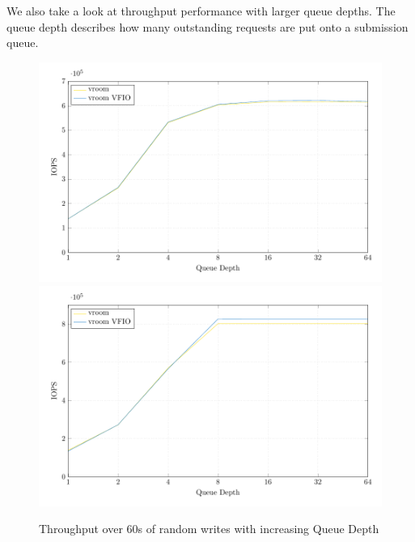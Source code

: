 We also take a look at throughput performance with larger queue depths. The queue depth describes how many outstanding requests are put onto a submission queue.



\begin{figure}[H]
  \centering
   {\includegraphics[width=.8\textwidth]{figures/qdnt1_2MiB} \label{fig:qdnt1-2MiB-intel}}
   {\includegraphics[width=.8\textwidth]{figures/qdnt1_2MiB_epyc} \label{fig:qdnt1-2MiB-epyc}}
  \caption{Throughput over 60s of random writes with increasing Queue Depth}
  \label{fig:qdnt1-2MiB}
\end{figure}

